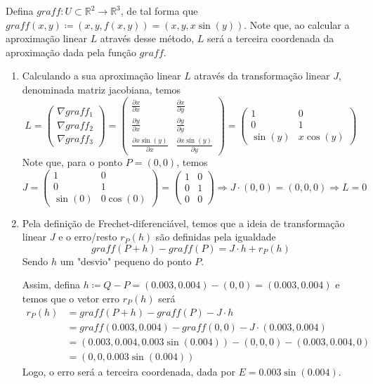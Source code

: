 \documentclass[../main.tex]{subfiles}
\begin{document}
		\begin{solucao}
			Defina $graff\colon U\subset \mathbb{R}^2\to \mathbb{R}^3$, de tal forma que $graff(x,y)\coloneq (x,y,f(x,y))=(x,y,x\sin(y))$. Note que, ao calcular a aproximação linear $L$ através desse método, $L$ será a terceira coordenada da aproximação dada pela função $graff$.
			\begin{enumerate}[label=\alph*)]
				\item Calculando a sua aproximação linear $L$ através da transformação linear $J$, denominada matriz jacobiana, temos
				\[
				L=\begin{pmatrix}\nabla graff_1\\\nabla graff_2\\\nabla graff_3\end{pmatrix} =\begin{pmatrix}\tfrac{\partial x}{\partial x}&\tfrac{\partial x}{\partial y}\\\tfrac{\partial y}{\partial x} & \tfrac{\partial y}{\partial y}\\\tfrac{\partial x\sin(y)}{\partial x}&\tfrac{\partial x\sin(y)}{\partial y}\end{pmatrix}=\begin{pmatrix}1&0\\0 & 1\\\sin(y)&x\cos(y)\end{pmatrix}
				\]
				Note que, para o ponto $P=(0,0)$, temos
				\[
				J=\begin{pmatrix}1&0\\0 & 1\\\sin(0)&0\cos(0)\end{pmatrix}=\begin{pmatrix}1&0\\0 & 1\\0&0\end{pmatrix}\Rightarrow J\cdot (0,0)=(0,0,0)\Rightarrow L=0
				\]
				\item Pela definição de Frechet-diferenciável, temos que a ideia de transformação linear $J$ e o erro/resto $r_P(h)$ são definidas pela igualdade
				\[
				graff(P+h)-graff(P)=J\cdot h+r_P(h)
				\]
				Sendo $h$ um "desvio" pequeno do ponto $P$.
				
				Assim, defina $h\coloneq Q-P=(0.003,0.004)-(0,0)=(0.003,0.004)$ e temos que o vetor erro $r_P(h)$ será
				\begin{align*}
					r_P(h)
					&=graff(P+h)-graff(P)-J\cdot h\\
					&=graff(0.003,0.004)-graff(0,0)-J\cdot (0.003,0.004)\\
					&=(0.003, 0.004, 0.003\sin(0.004)) -(0,0,0)-(0.003, 0.004, 0)\\
					&=(0,0,0.003\sin(0.004))
				\end{align*}
				Logo, o erro será a terceira coordenada, dada por $E=0.003\sin(0.004)$.
			\end{enumerate}
		\end{solucao}
		
\end{document}
